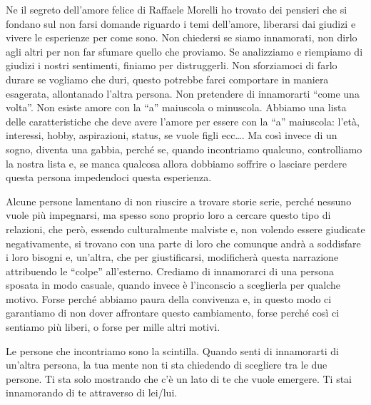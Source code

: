\documentclass[12pt]{book} %
\begin{document}
Ne il segreto dell'amore felice di Raffaele Morelli ho trovato dei
pensieri che si fondano sul non farsi domande riguardo i temi dell'amore, liberarsi dai giudizi e
vivere le esperienze per come sono. Non chiedersi se siamo innamorati, non dirlo agli altri per non far sfumare quello
che proviamo. Se analizziamo e riempiamo di giudizi i nostri sentimenti, finiamo per distruggerli. Non sforziamoci di
farlo durare se vogliamo che duri, questo potrebbe farci comportare in maniera esagerata, allontanado l'altra persona.
Non pretendere di innamorarti “come una volta”. Non esiste amore con la “a” maiuscola o minuscola. Abbiamo una lista
delle caratteristiche che deve avere l'amore per essere con la “a” maiuscola:
l'età, interessi, hobby, aspirazioni, status, se vuole figli ecc…. Ma così invece di un sogno,
diventa una gabbia, perché se, quando incontriamo qualcuno, controlliamo la nostra lista e, se manca qualcosa allora
dobbiamo soffrire o lasciare perdere questa persona impedendoci questa esperienza.

Alcune persone lamentano di non riuscire a trovare storie serie, perché nessuno vuole più
impegnarsi, ma spesso sono proprio loro a cercare questo tipo di relazioni, che però, essendo culturalmente
malviste e, non volendo essere giudicate negativamente, si trovano con una parte di loro che comunque andrà a
soddisfare i loro bisogni e, un'altra, che per giustificarsi, modificherà questa narrazione
attribuendo le “colpe” all'esterno. Crediamo di innamorarci di una persona sposata in modo
casuale, quando invece è l'inconscio a sceglierla per qualche motivo. Forse perché abbiamo paura
della convivenza e, in questo modo ci garantiamo di non dover affrontare questo cambiamento, forse perché così ci
sentiamo più liberi, o forse per mille altri motivi.

Le persone che incontriamo sono la scintilla. Quando senti di innamorarti di un'altra persona, la tua mente non ti sta chiedendo di
scegliere tra le due persone. Ti sta solo mostrando che c'è un lato di te che vuole emergere. Ti stai innamorando di te attraverso di
lei/lui. 
\end{document}
